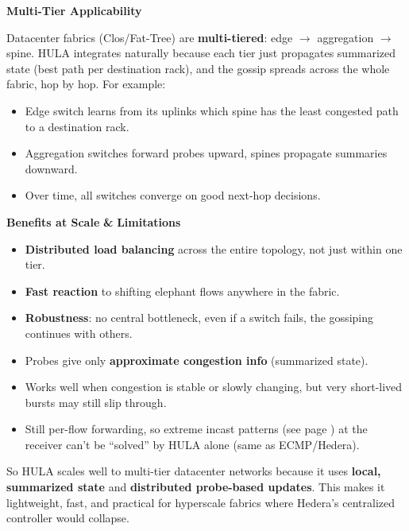 \highspace
\begin{flushleft}
    \textcolor{Green3}{ \textbf{Multi-Tier Applicability}}
\end{flushleft}
Datacenter fabrics (Clos/Fat-Tree) are \textbf{multi-tiered}: edge $\rightarrow$ aggregation $\rightarrow$ spine. HULA integrates naturally because each tier just propagates summarized state (best path per destination rack), and the gossip spreads across the whole fabric, hop by hop. For example:
\begin{itemize}
    \item Edge switch learns from its uplinks which spine has the least congested path to a destination rack.
    \item Aggregation switches forward probes upward, spines propagate summaries downward.
    \item Over time, all switches converge on good next-hop decisions.
\end{itemize}

\highspace
\begin{flushleft}
    \textcolor{Green3}{ \textbf{Benefits at Scale}} \textbf{\&} \textcolor{Red2}{ \textbf{Limitations}}
\end{flushleft}
\begin{itemize}
    \item[\textcolor{Green3}{\faIcon{check}}] \textbf{Distributed load balancing} across the entire topology, not just within one tier.
    \item[\textcolor{Green3}{\faIcon{check}}] \textbf{Fast reaction} to shifting elephant flows anywhere in the fabric.
    \item[\textcolor{Green3}{\faIcon{check}}] \textbf{Robustness}: no central bottleneck, even if a switch fails, the gossiping continues with others.
    \item[\textcolor{Red2}{\faIcon{times}}] Probes give only \textbf{approximate congestion info} (summarized state).
    \item[\textcolor{Red2}{\faIcon{times}}] Works well when congestion is stable or slowly changing, but very short-lived bursts may still slip through.
    \item[\textcolor{Red2}{\faIcon{times}}] Still per-flow forwarding, so extreme incast patterns (see page \pageref{def: Bursty Traffic - Incast}) at the receiver can't be ``solved'' by HULA alone (same as ECMP/Hedera).
\end{itemize}
So HULA scales well to multi-tier datacenter networks because it uses \textbf{local, summarized state} and \textbf{distributed probe-based updates}. This makes it lightweight, fast, and practical for hyperscale fabrics where Hedera's centralized controller would collapse.